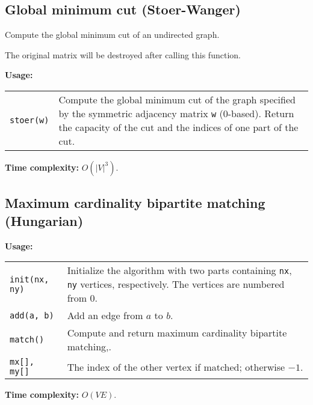\subsection{Global minimum cut (Stoer-Wanger)}
Compute the global minimum cut of an undirected graph. \par
\Warning The original matrix will be destroyed after calling this function.\par
\textbf{Usage:} \\[0.1cm]
\begin{tabular}{p{1.5cm} p{10cm}}
  \lstinline|stoer(w)| & Compute the global minimum cut of the graph specified by the symmetric adjacency matrix \lstinline|w| (0-based). Return the capacity of the cut and the indices of one part of the cut. \\
\end{tabular} \par
\textbf{Time complexity:} $O(|V|^3)$. \par


\subsection{Maximum cardinality bipartite matching (Hungarian)}
\textbf{Usage:} \\[0.1cm]
\begin{tabular}{p{2.5cm} p{8cm}}
  \lstinline|init(nx, ny)| & Initialize the algorithm with two parts containing  \lstinline|nx|,  \lstinline|ny| vertices, respectively. The vertices are numbered from 0. \\
  \lstinline|add(a, b)| & Add an edge from $a$ to $b$. \\
  \lstinline|match()| & Compute and return maximum cardinality bipartite matching,. \\
  \lstinline|mx[], my[]| & The index of the other vertex if matched; otherwise $-1$. \\
\end{tabular} \par
\textbf{Time complexity:} $O(VE)$. \par



